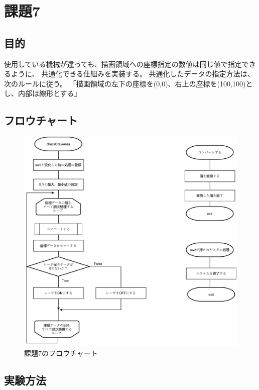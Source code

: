 \documentclass{jarticle}
\begin{document}
\section{課題7}
\subsection{目的}
 使用している機械が違っても、描画領域への座標指定の数値は同じ値で指定できるように、 共通化できる仕組みを実装する。
 共通化したデータの指定方法は、次のルールに従う。 「描画領域の左下の座標を(0,0)、右上の座標を(100,100)とし、内部は線形とする」


\subsection{フロウチャート}

\begin{figure}[H]
    \centering
    \includegraphics[scale=0.8]{kumikomiKadai7..pdf}
    \caption{課題7のフロウチャート}
    \label{fig:my_label}
\end{figure}


\subsection{実験方法}
\end{document}
